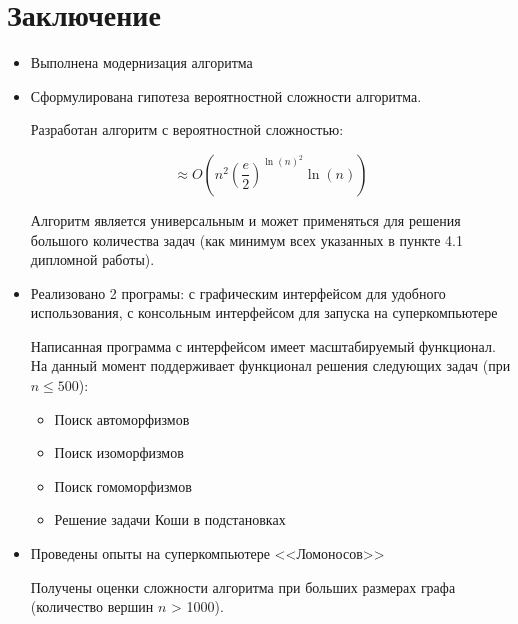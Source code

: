\section*{Заключение}
\label{sec:Conclusion} 
\large

\begin{itemize}
\item Выполнена модернизация алгоритма
\item Сформулирована гипотеза вероятностной сложности алгоритма.

Разработан алгоритм с вероятностной сложностью:

$$\approx O(n^2(\frac{e}{2})^{\ln(n)^2} \ln(n))$$

Алгоритм является универсальным и может применяться для решения большого количества задач (как минимум всех указанных в пункте 4.1 дипломной работы).

\item Реализовано 2 програмы: с графическим интерфейсом для удобного использования, с консольным интерфейсом для запуска на суперкомпьютере

Написанная программа с интерфейсом имеет масштабируемый функционал. На данный момент поддерживает функционал решения следующих задач (при $n \leq  500$):

\begin{itemize}
\item Поиск автоморфизмов
\item Поиск изоморфизмов
\item Поиск гомоморфизмов
\item Решение задачи Коши в подстановках
\end{itemize}

\item Проведены опыты на суперкомпьютере <<Ломоносов>>

Получены оценки сложности алгоритма при больших размерах графа (количество вершин $n$ > 1000).

\end{itemize}

